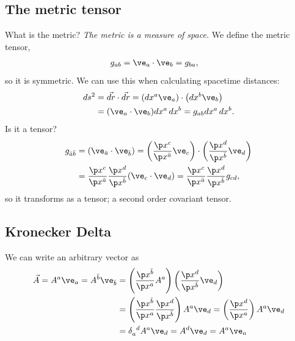 \documentclass[a4paper, 11pt, normalem]{report}
\begin{document}
\section{The metric tensor}
What is the metric? \emph{The metric is a measure of space.}
We define the metric tensor, 
\begin{align}
    g_{ab} &= \ve_a\cdot\ve_b = g_{ba},
\end{align}
so it is symmetric.
We can use this when calculating spacetime distances:
\begin{align}
    ds^2 &= \vec{dr}\cdot\vec{dr} = \left(dx^a\ve_a\right)\cdot\left(dx^b\ve_b\right) \\
         &= (\ve_a\cdot\ve_b)dx^a\,dx^b = g_{ab}dx^a\,dx^b.
\end{align}
Is it a tensor?
\begin{align}
    g_{\bar{a}\bar{b}} &= (\ve_{\bar{a}}\cdot\ve_{\bar{b}}) = \left(\frac{\p x^c}{\p x^{\bar{a}}}\ve_c\right)\cdot\left(\frac{\p x^{d}}{\p x^{\bar{b}}}\ve_d\right) \\
                       &= \frac{\p x^c}{\p x^{\bar{a}}}\frac{\p x^d}{\p x^{\bar{b}}}(\ve_c\cdot\ve_d) = \frac{\p x^c}{\p x^{\bar{a}}}\frac{\p x^d}{\p x^{\bar{b}}}g_{cd},
\end{align}
so it transforms as a tensor; a second order covariant tensor. 

\section{Kronecker Delta}
We can write an arbitrary vector as 
\begin{align}
    \vec{A} = A^a\ve_a = A^{\bar{b}}\ve_{\bar{b}} &= \left(\frac{\p x^{\bar{b}}}{\p x^a}A^a\right)\left(\frac{\p x^{d}}{\p x^{\bar{b}}}\ve_d\right) \\
                                                  &= \left(\frac{\p x^{\bar{b}}}{\p x^a}\frac{\p x^{d}}{\p x^{\bar{b}}}\right)A^a\ve_d = \left(\frac{\p x^{d}}{\p x^a}\right)A^a\ve_d \\
                                                  &= \tensor{\delta}{_a^d}A^a\ve_d = A^d\ve_d = A^a\ve_a
\end{align}

\chapter{}

\chapter{}
\end{document}
